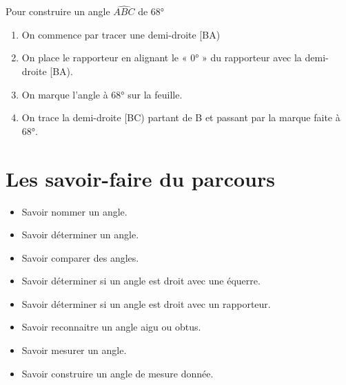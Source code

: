 \documentclass[a4paper,dvipsnames]{article}
\begin{document}
\begin{Mt}
Pour construire un angle $\widehat{ABC}$ de 68°
\begin{enumerate}
    \item On commence par tracer une demi-droite [BA)
    \item On place le rapporteur en alignant le « 0° » du rapporteur avec la demi-droite [BA).
    \item On marque l'angle à 68° sur la feuille.
    \item On trace la demi-droite [BC) partant de B et passant par la marque faite à 68°.
\end{enumerate}
\end{Mt}

\section{Les savoir-faire du parcours}

\begin{CpsCol}
\begin{itemize}
\item Savoir nommer un angle.
\item Savoir déterminer un angle.
\item Savoir comparer des angles.
\item Savoir déterminer si un angle est droit avec une équerre.   
\item Savoir déterminer si un angle est droit avec un rapporteur.   
\item Savoir reconnaitre un angle aigu ou obtus.   
\item Savoir mesurer un angle.
\item Savoir construire un angle de mesure donnée.
\end{itemize}
\end{CpsCol}
\end{document}
